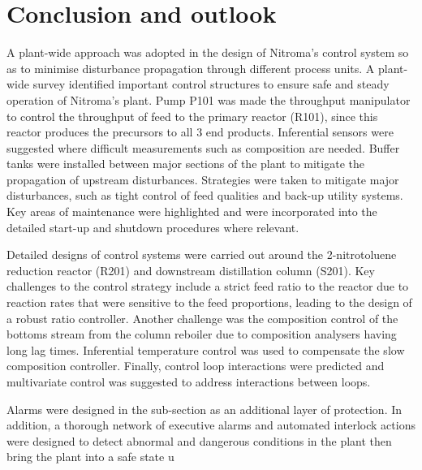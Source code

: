 \section{Conclusion and outlook}
A plant-wide approach was adopted in the design of Nitroma's control system so as to minimise disturbance propagation through different process units. A plant-wide survey identified important control structures to ensure safe and steady operation of Nitroma's plant. Pump P101 was made the throughput manipulator to control the throughput of feed to the primary reactor (R101), since this reactor produces the precursors to all 3 end products. Inferential sensors were suggested where difficult measurements such as composition are needed. Buffer tanks were installed between major sections of the plant to mitigate the propagation of upstream disturbances. Strategies were taken to mitigate major disturbances, such as tight control of feed qualities and back-up utility systems. Key areas of maintenance were highlighted and were incorporated into the detailed start-up and shutdown procedures where relevant.

Detailed designs of control systems were carried out around the 2-nitrotoluene reduction reactor (R201) and downstream distillation column (S201). Key challenges to the control strategy include a strict feed ratio to the reactor due to reaction rates that were sensitive to the feed proportions, leading to the design of a robust ratio controller. Another challenge was the composition control of the bottoms stream from the column reboiler due to composition analysers having long lag times. Inferential temperature control was used to compensate the slow composition controller. Finally, control loop interactions were predicted and multivariate control was suggested to address interactions between loops.  

Alarms were designed in the sub-section as an additional layer of protection. In addition, a thorough network of executive alarms and automated interlock actions were designed to detect abnormal and dangerous conditions in the plant then bring the plant into a safe state u  